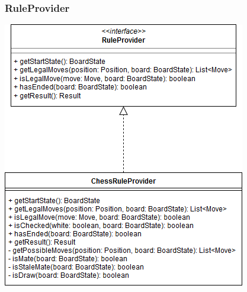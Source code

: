 \documentclass[parskip=full]{scrartcl}
\begin{document}
		\subsubsection{RuleProvider}
		\begin{minipage}{\linewidth}
			\centering
			\includegraphics[width=1\linewidth]{Diagramme/RuleProvider}
			\label{fig:ruleProvider}
		\end{minipage}
\end{document}

